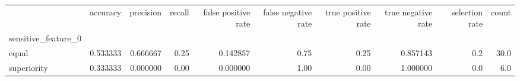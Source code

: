 \begin{tabular}{lrrrrrrrrr}
\toprule
{} &  accuracy &  precision &  recall &  false positive rate &  false negative rate &  true positive rate &  true negative rate &  selection rate &  count \\
sensitive\_feature\_0 &           &            &         &                      &                      &                     &                     &                 &        \\
\midrule
equal               &  0.533333 &   0.666667 &    0.25 &             0.142857 &                 0.75 &                0.25 &            0.857143 &             0.2 &   30.0 \\
superiority         &  0.333333 &   0.000000 &    0.00 &             0.000000 &                 1.00 &                0.00 &            1.000000 &             0.0 &    6.0 \\
\bottomrule
\end{tabular}
